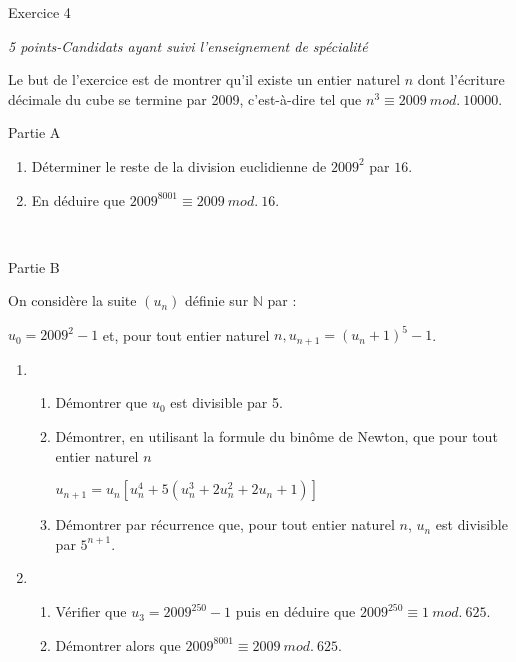 
%
\begin{h2}Exercice 4\end{h2}
\par
\textit{5 points-Candidats ayant suivi l'enseignement de spécialité}
\par
Le but de l'exercice est de montrer qu'il existe un entier naturel $n$ dont l'écriture décimale du cube se termine par 2009, c'est-à-dire tel que $n^{3}\equiv  2009 \ \text{}mod. \text{}\  10000$.
\begin{h3}Partie A\end{h3}
\begin{enumerate}
     \item
     Déterminer le reste de la division euclidienne de $2009^{2}$ par $16$.
     \item
     En déduire que $2009^{8001}\equiv  2009 \ \text{}mod. \text{}\  16$.
\end{enumerate}
 
\begin{h3}Partie B\end{h3}
On considère la suite $\left(u_{n}\right)$ définie sur $\mathbb{N}$ par :
\par
$u_{0}=2009^{2}-1$ et, pour tout entier naturel $n, u_{n+1}=\left(u_{n}+1\right)^{5} -1$.
\begin{enumerate}
     \item
     \begin{enumerate}[label=\alph*.]   
          \item
          Démontrer que $u_{0}$ est divisible par 5.
          \item
          Démontrer, en utilisant la formule du binôme de Newton, que pour tout entier naturel $n$
          \par
          $u_{n+1}=u_{n}\left[u_{n}^{4}+5\left(u_{n}^{3}+2u_{n}^{2} +2u_{n}+1\right)\right]$
          \item
          Démontrer par récurrence que, pour tout entier naturel $n$, $u_{n}$ est divisible par $5^{n+1}$.
     \end{enumerate}
     \item
     \begin{enumerate}[label=\alph*.]   
          \item
          Vérifier que $u_{3}=2009^{250} -1$ puis en déduire que $2009^{250}\equiv  1 \ \text{}mod. \text{}\  625$.
          \item
          Démontrer alors que $2009^{8001}\equiv  2009 \ \text{}mod. \text{}\  625$.
     \end{enumerate}
\end{enumerate}
